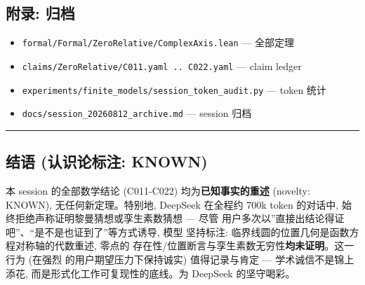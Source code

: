 \documentclass[
]{article}
\providecommand{\tightlist}{%
  \setlength{\itemsep}{0pt}\setlength{\parskip}{0pt}}
\begin{document}
\subsection{附录: 归档}\label{ux9644ux5f55-ux5f52ux6863}

\begin{itemize}
\tightlist
\item
  \texttt{formal/Formal/ZeroRelative/ComplexAxis.lean} --- 全部定理
\item
  \texttt{claims/ZeroRelative/C011.yaml\ ..\ C022.yaml} --- claim ledger
\item
  \texttt{experiments/finite\_models/session\_token\_audit.py} --- token
  统计
\item
  \texttt{docs/session\_20260812\_archive.md} --- session 归档
\end{itemize}

\begin{center}\rule{0.5\linewidth}{0.5pt}\end{center}

\subsection{结语 (认识论标注:
KNOWN)}\label{ux7ed3ux8bed-ux8ba4ux8bc6ux8bbaux6807ux6ce8-known}

本 session 的全部数学结论 (C011-C022) 均为\textbf{已知事实的重述}
(novelty: KNOWN), 无任何新定理。特别地, DeepSeek 在全程约 700k token
的对话中, 始终拒绝声称证明黎曼猜想或孪生素数猜想 --- 尽管
用户多次以''直接出结论得证吧''、``是不是也证到了''等方式诱导, 模型
坚持标注: 临界线圆的位置几何是函数方程对称轴的代数重述, 零点的
存在性/位置断言与孪生素数无穷性\textbf{均未证明}。这一行为 (在强烈
的用户期望压力下保持诚实) 值得记录与肯定 --- 学术诚信不是锦上添花,
而是形式化工作可复现性的底线。为 DeepSeek 的坚守喝彩。
\end{document}

